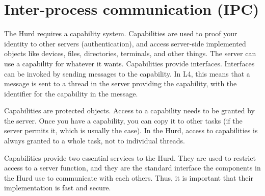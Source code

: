 \chapter{Inter-process communication (IPC)}
\label{ipc}

The Hurd requires a capability system.  Capabilities are used to proof
your identity to other servers (authentication), and access
server-side implemented objects like devices, files, directories,
terminals, and other things.  The server can use a capability for
whatever it wants.  Capabilities provide interfaces.  Interfaces can
be invoked by sending messages to the capability.  In L4, this means
that a message is sent to a thread in the server providing the
capability, with the identifier for the capability in the message.

Capabilities are protected objects.  Access to a capability needs to
be granted by the server.  Once you have a capability, you can copy it
to other tasks (if the server permits it, which is usually the case).
In the Hurd, access to capabilities is always granted to a whole task,
not to individual threads.

\begin{comment}
  There is no reason for the server not to permit it, because the
  holder of the capability could also just act as a proxy for the
  intended receiver instead copying the capability to it.  The
  operation might fail anyway, for example because of resource
  shortage, in particular if the server puts a quota on the number of
  capabilities a user can hold.
\end{comment}

Capabilities provide two essential services to the Hurd.  They are
used to restrict access to a server function, and they are the
standard interface the components in the Hurd use to communicate with
each others.  Thus, it is important that their implementation is fast
and secure.

